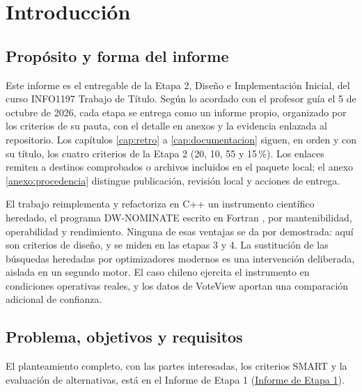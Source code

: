 \chapter{Introducción}
\label{cap:introduccion}

\section{Propósito y forma del informe}
\label{sec:proposito}

Este informe es el entregable de la Etapa 2, Diseño e Implementación Inicial, del curso
INFO1197 Trabajo de Título. Según lo acordado con el profesor guía el 5 de octubre de 2026,
cada etapa se entrega como un informe propio, organizado por los criterios de su pauta, con el
detalle en anexos y la evidencia enlazada al repositorio. Los capítulos \ref{cap:retro} a
\ref{cap:documentacion} siguen, en orden y con su título, los cuatro criterios de la Etapa 2
(20, 10, 55 y 15\,\%). Los enlaces remiten a destinos comprobados o archivos incluidos en el paquete local;
el anexo \ref{anexo:procedencia} distingue publicación, revisión local y acciones de entrega.

El trabajo reimplementa y refactoriza en C++ un instrumento científico heredado, el programa
DW-NOMINATE escrito en Fortran \parencite{poole2005spatial}, por mantenibilidad, operabilidad y
rendimiento. Ninguna de esas ventajas se da por demostrada: aquí son criterios de diseño, y se
miden en las etapas 3 y 4. La sustitución de las búsquedas heredadas por optimizadores modernos
es una intervención deliberada, aislada en un segundo motor. El caso chileno ejercita el
instrumento en condiciones operativas reales, y los datos de VoteView
\parencite{boche2018voteview} aportan una comparación adicional de confianza.

\section{Problema, objetivos y requisitos}
\label{sec:recap}

El planteamiento completo, con las partes interesadas, los criterios SMART y la evaluación de
alternativas, está en el Informe de Etapa 1 (\href{run:../evidence/informe-etapa-1.pdf}{Informe de Etapa 1}).

